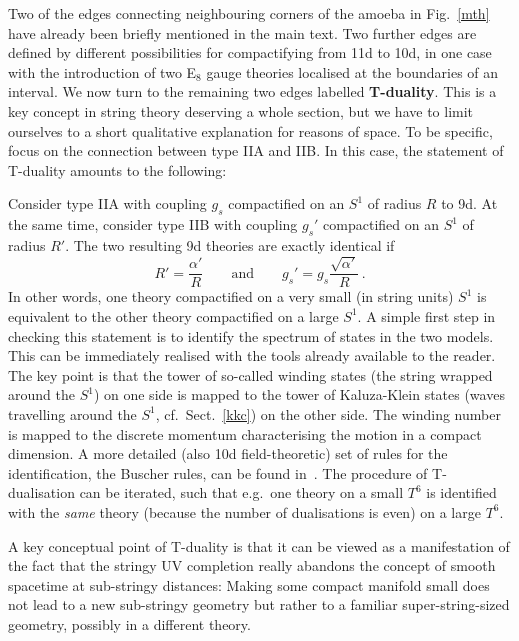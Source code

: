 \documentclass[12pt]{article}
\newcommand{\be}{\begin{equation}}
\newcommand{\ee}{\end{equation}}
\numberwithin{equation}{section}
\begin{document}
Two of the edges connecting neighbouring corners of the amoeba in Fig.~\ref{mth} have already been briefly mentioned in the main text. Two further edges are defined by different possibilities for compactifying from 11d to 10d, in one case with the introduction of two E$_8$ gauge theories localised at the boundaries of an interval. We now turn to the remaining two edges labelled {\bf T-duality}. This is a key concept in string theory deserving a whole section, but we have to limit ourselves to a short qualitative explanation for reasons of space. To be specific, focus on the connection between type IIA and IIB. In this case, the statement of T-duality amounts to the following:

Consider type IIA with coupling $g_s$ compactified on an $S^1$ of radius $R$ to 9d. At the same time, consider type IIB with coupling $g_s'$ compactified on an $S^1$ of radius $R'$. The two resulting 9d theories are exactly identical if 
\be
R'=\frac{\alpha'}{R} \qquad\mbox{and}\qquad g_s'=g_s\frac{\sqrt{\alpha'}}{R}\,.
\ee
In other words, one theory compactified on a very small (in string units) $S^1$ is equivalent to the other theory compactified on a large $S^1$. A simple first step in checking this statement is to identify the spectrum of states in the two models. This can be immediately realised with the tools already available to the reader. The key point is that the tower of so-called winding states (the string wrapped around the $S^1$) on one side is mapped to the tower of Kaluza-Klein states (waves travelling around the $S^1$, cf.~Sect.~\ref{kkc}) on the other side. The winding number is mapped to the discrete momentum characterising the motion in a compact dimension. A more detailed (also 10d field-theoretic) set of rules for the identification, the Buscher rules, can be found in~\cite{Buscher:1987qj}. The procedure of T-dualisation can be iterated, such that e.g.~one theory on a small $T^6$ is identified with the {\it same} theory (because the number of dualisations is even) on a large $T^6$.  

A key conceptual point of T-duality is that it can be viewed as a manifestation of the fact that the stringy UV completion really abandons the concept of smooth spacetime at sub-stringy distances: Making some compact manifold small does not lead to a new sub-stringy geometry but rather to a familiar super-string-sized  geometry, possibly in a different theory.  
\end{document}

